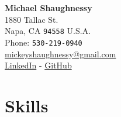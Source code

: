 \documentclass[11pt, a4paper]{article}
\begin{document}
{\LARGE \textbf{Michael Shaughnessy}} \\[1cm]
1880 Tallac St.\\
Napa, CA \texttt{94558}
U.S.A.\\[.2cm]
Phone: \texttt{530-219-0940}\\
{\color{hyperlinkcolor}\href{mailto:mickeyshaughnessy@gmail.com}{mickeyshaughnessy@gmail.com} \\ 
\href{https://www.linkedin.com/in/michaelshaughnessy1}{LinkedIn} - 
\href{https://github.com/mickeyshaughnessy}{GitHub}}

\section*{\color{mycolor4}\textbf{Skills}}
\end{document}

